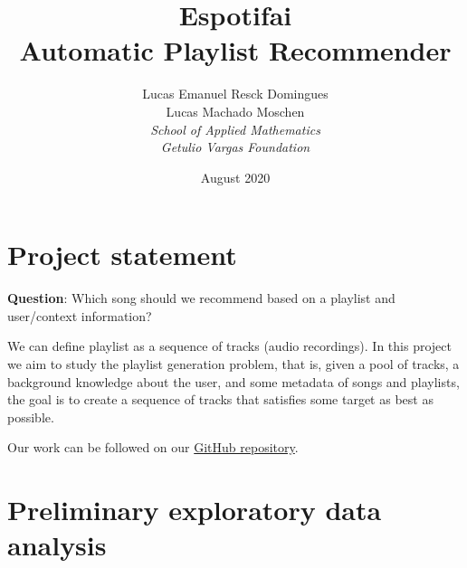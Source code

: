 \documentclass{article}
\title{Espotifai\\
\large Automatic Playlist Recommender}
\author{Lucas Emanuel Resck Domingues\\
Lucas Machado Moschen\\
\textit{School of Applied Mathematics}\\
\textit{Getulio Vargas Foundation}\\}
\date{August 2020}
\begin{document}
\maketitle

\section{Project statement}

    \textbf{Question}: Which song should we recommend based on
    a playlist and user/context information?

    We can define playlist as a sequence of tracks (audio recordings).
    In this project we aim to study the playlist generation problem, that is,
    given a pool of tracks, a background knowledge about the user,
    and some metadata of songs and playlists, the goal is to create a sequence
    of tracks that satisfies some target as best as possible.

    Our work can be followed on our \href{https://github.com/lucasresck/espotifai}{GitHub repository}.

    
\section{Preliminary exploratory data analysis}
\end{document}
